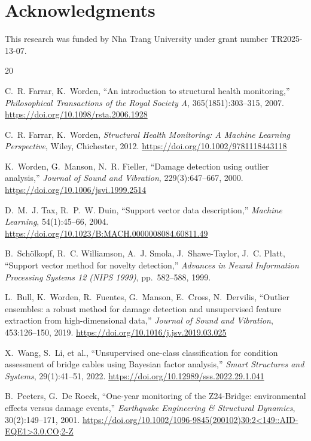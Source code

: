 \documentclass[11pt,a4paper]{article}
\begin{document}
\section*{Acknowledgments}
This research was funded by Nha Trang University under grant number
TR2025-13-07.

\begin{thebibliography}{20}

C.~R. Farrar, K.~Worden,
``An introduction to structural health monitoring,''
\emph{Philosophical Transactions of the Royal Society A},
365(1851):303--315, 2007.
\url{https://doi.org/10.1098/rsta.2006.1928}

C.~R. Farrar, K.~Worden,
\emph{Structural Health Monitoring: A Machine Learning Perspective},
Wiley, Chichester, 2012.
\url{https://doi.org/10.1002/9781118443118}

K.~Worden, G.~Manson, N.~R. Fieller,
``Damage detection using outlier analysis,''
\emph{Journal of Sound and Vibration}, 229(3):647--667, 2000.
\url{https://doi.org/10.1006/jsvi.1999.2514}

D.~M.~J. Tax, R.~P.~W. Duin,
``Support vector data description,''
\emph{Machine Learning}, 54(1):45--66, 2004.
\url{https://doi.org/10.1023/B:MACH.0000008084.60811.49}

B.~Sch\"olkopf, R.~C. Williamson, A.~J. Smola, J.~Shawe-Taylor, J.~C. Platt,
``Support vector method for novelty detection,''
\emph{Advances in Neural Information Processing Systems 12 (NIPS 1999)},
pp.~582--588, 1999.

L.~Bull, K.~Worden, R.~Fuentes, G.~Manson, E.~Cross, N.~Dervilis,
``Outlier ensembles: a robust method for damage detection and unsupervised
feature extraction from high-dimensional data,''
\emph{Journal of Sound and Vibration}, 453:126--150, 2019.
\url{https://doi.org/10.1016/j.jsv.2019.03.025}

X.~Wang, S.~Li, et al.,
``Unsupervised one-class classification for condition assessment of bridge
cables using Bayesian factor analysis,''
\emph{Smart Structures and Systems}, 29(1):41--51, 2022.
\url{https://doi.org/10.12989/sss.2022.29.1.041}

B.~Peeters, G.~De Roeck,
``One-year monitoring of the Z24-Bridge: environmental effects versus damage
events,''
\emph{Earthquake Engineering \& Structural Dynamics}, 30(2):149--171, 2001.
\url{https://doi.org/10.1002/1096-9845(200102)30:2<149::AID-EQE1>3.0.CO;2-Z}


\end{thebibliography}
\end{document}
